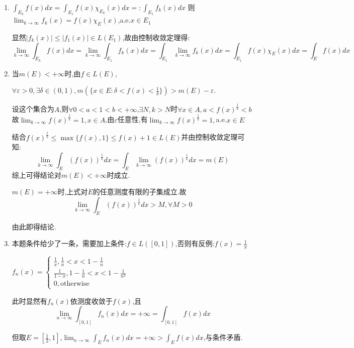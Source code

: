 \documentclass[UTF8, a4paper, 12pt, oneside, onecolumn]{article}
\numberwithin{equation}{section}
\numberwithin{figure}{section}
\numberwithin{table}{section}
\theoremstyle{nonumberplain}	%
\theoremstyle{plain}	%
\theoremstyle{plain}	%
\theoremstyle{plain}	%
\theoremstyle{plain}	%
\theoremstyle{nonumberplain}
\begin{document}
\begin{enumerate}
	\item $\displaystyle\int_{E_k}f(x)dx=\int_{E_1}f(x)\chi_{E_k}(x)dx=:\int_{E_1}f_k(x)dx$
	则$\displaystyle\lim_{k\rightarrow \infty} f_k(x)=f(x)\chi_{E}(x)$,a.e.$x\in E_1$
	
	显然$|f_k(x)|\leqslant|f_1(x)|\in L(E_1)$,故由控制收敛定理得:
	$$\lim_{k\rightarrow \infty}\int_{E_k}f(x)dx=\lim_{k\rightarrow \infty}\int_{E_1}f_k(x)dx=\int_{E_1}\lim_{k\rightarrow \infty}f_k(x)dx=\int_{E_1}f(x)\chi_{E}(x)dx=\int_{E}f(x)dx$$
	
	\item 当$m(E)<+\infty$时,由$\displaystyle f\in L(E),$
	
	$\displaystyle\forall\varepsilon>0,\exists \delta\in(0,1),m(\{x\in E:\delta<f(x)<\frac{1}{\delta}\})>m(E)-\varepsilon$.
	
	设这个集合为$A$,则$\forall 0<a<1<b<+\infty$,$\exists N,k>N$时$\displaystyle\forall x\in A ,a<f(x)^{\frac{1}{k}}<b$故$\displaystyle\lim_{k\rightarrow \infty}f(x)^{\frac{1}{k}}=1,x\in A$,由$\varepsilon$任意性,有$\displaystyle\lim_{k\rightarrow \infty}f(x)^{\frac{1}{k}}=1,$a.e.$x\in E$
	
	结合$f(x)^\frac{1}{k}\leqslant \max\{f(x),1\}\leqslant f(x)+1\in L(E)$并由控制收敛定理可知:
	$$\lim_{k\rightarrow \infty}\int_{E}(f(x))^{\frac{1}{k} }dx=\int_{E}\lim_{k\rightarrow \infty}(f(x))^{\frac{1}{k} }dx=m(E)$$
	综上可得结论对$m(E)<+\infty$时成立.
	
	$m(E)=+\infty$时,上式对$E$的任意测度有限的子集成立.故
	$$\displaystyle\lim_{k\rightarrow \infty}\int_{E}(f(x))^{\frac{1}{k} }dx>M,\forall M>0$$
	
	由此即得结论.
	
	\item 本题条件给少了一条，需要加上条件:$f\in L([0,1])$,否则有反例:$\displaystyle f(x)=\frac{1}{x}$
	
	$\displaystyle f_n(x)=\left\{\begin{array}{c}\displaystyle\frac{1}{x},\frac{1}{n}<x<1-\frac{1}{n}\\\displaystyle\frac{1}{1-x},1-\frac{1}{n}<x<1-\frac{1}{n^2}\\\displaystyle0,\text{otherwise}\end{array}\right.$
	
	此时显然有$f_n(x)$依测度收敛于$f(x)$,且
	$$\displaystyle\lim_{n\rightarrow \infty}\int_{[0,1]}f_n(x)dx=+\infty=\int_{[0,1]}f(x)dx$$
	
	但取$\displaystyle E=[\frac{1}{2},1]$,$\displaystyle\lim_{n\rightarrow \infty}\int_Ef_n(x)dx=+\infty>\int_Ef(x)dx $,与条件矛盾.
	

\end{enumerate}
\end{document}
